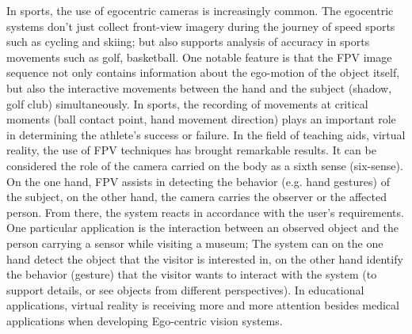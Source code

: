 In sports, the use of egocentric cameras is increasingly common. The egocentric systems don't just collect front-view imagery during the journey of speed sports such as cycling and skiing; but also supports analysis of accuracy in sports movements such as golf, basketball. One notable feature is that the FPV image sequence not only contains information about the ego-motion of the object itself, but also the interactive movements between the hand and the subject (shadow, golf club) simultaneously. In sports, the recording of movements at critical moments (ball contact point, hand movement direction) plays an important role in determining the athlete's success or failure.
In the field of teaching aids, virtual reality, the use of FPV techniques has brought remarkable results. It can be considered the role of the camera carried on the body as a sixth sense (six-sense). On the one hand, FPV assists in detecting the behavior (e.g. hand gestures) of the subject, on the other hand, the camera carries the observer or the affected person. From there, the system reacts in accordance with the user's requirements. One particular application is the interaction between an observed object and the person carrying a sensor while visiting a museum; The system can on the one hand detect the object that the visitor is interested in, on the other hand identify the behavior (gesture) that the visitor wants to interact with the system (to support details, or see objects from different perspectives). In educational applications, virtual reality is receiving more and more attention besides medical applications when developing Ego-centric vision systems.
